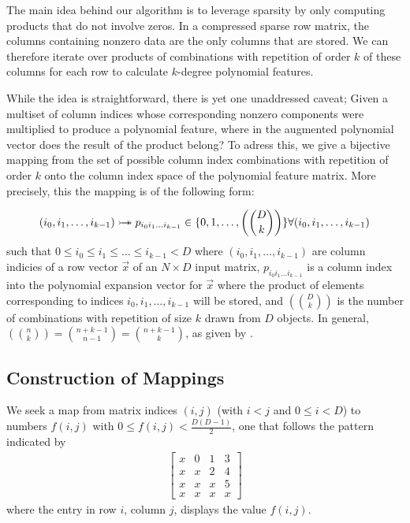 \documentclass{article} %
\begin{document}
The main idea behind our algorithm is to leverage sparsity by only computing products that do not involve zeros.
In a compressed sparse row matrix, the columns containing nonzero data are the only columns that are stored.
We can therefore iterate over products of combinations with repetition of order $k$ of these columns for each row to calculate $k$-degree polynomial features.

While the idea is straightforward, there is yet one unaddressed caveat;
Given a multiset of column indices whose corresponding nonzero components were multiplied to produce a polynomial feature, where in the augmented polynomial vector does the result of the product belong?
To adress this, we give a bijective mapping from the set of possible column index combinations with repetition of order $k$ onto the column index space of the polynomial feature matrix.
More precisely, this the mapping is of the following form:

\begin{equation}
(i_0, i_1, \dots, i_{k-1}) \rightarrowtail \hspace{-1.9ex} \twoheadrightarrow p_{i_0i_1 \dots i_{k-1}} \in \{0,1,\dots, \left(\binom{D}{k}\right)\} 
\forall (i_0, i_1, \dots, i_{k-1})
\end{equation}
such that $ 0 \le i_0 \le i_1 \le \dots \le i_{k-1} < D$
where $(i_0, i_1, \dots, i_{k-1})$ are column indicies of a row vector $\vec{x}$ of an $N \times D$ input matrix, $p_{i_0i_1 \dots i_{k-1}}$ is a column index into the polynomial expansion vector for $\vec{x}$ where the product of elements corresponding to indices $i_0, i_1, \dots, i_{k-1}$ will be stored,
and $\left(\binom{D}{k}\right)$ is the number of combinations with repetition of size $k$ drawn from $D$ objects.
In general, $\left(\binom{n}{k}\right) = \binom{n+k-1}{n-1} = \binom{n+k-1}{k}$, as given by \cite{stanley1986enumerative}.

\subsection{Construction of Mappings}

We seek a map from matrix indices $(i, j)$ (with $i < j$ and $0 \le i < D$) to numbers $f(i, j)$ with $0 \le f(i, j) < \frac{D(D-1)}{2}$, one that follows the pattern indicated by 
\begin{align}
\begin{bmatrix}
x & 0 & 1 & 3 \\
x & x & 2 & 4 \\
x & x & x & 5 \\
x & x & x & x
\end{bmatrix}
\label{eq:4x4mat}
\end{align}
where the entry in row $i$, column $j$, displays the value $f(i, j)$. 
\end{document}
